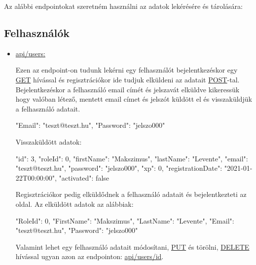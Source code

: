 
Az alábbi endpointokat szeretném használni az adatok lekérésére és tárolására:
\subsection{Felhasználók}
\begin{itemize}[label={$\bullet$}, topsep=0pt, itemsep=0pt, leftmargin=15pt]
    \item[] {\url{api/users:}}
          \begin{addmargin}[\parindent]{0pt}
              Ezen az endpoint-on tudunk lekérni egy felhasználót bejelentkezéskor egy \url{GET} hívással és regisztrációkor ide tudjuk elküldeni az adatait \url{POST}-tal. Bejelentkezéskor a felhasználó email címét és jelszavát elküldve kikeressük hogy valóban létező, mentett email címet és jelszót küldött el és visszaküldjük a felhasználó adatait.

              \begin{json}
{
    "Email": "teszt@teszt.hu",
    "Password": "jelszo000"
}
              \end{json}

              Visszaküldött adatok:
              \begin{json}
{
    "id": 3,
    "roleId": 0,
    "firstName": "Makszimus",
    "lastName": "Levente",
    "email": "teszt@teszt.hu",
    "password": "jelszo000",
    "xp": 0,
    "registrationDate": "2021-01-22T00:00:00",
    "activated": false
}
            \end{json}

              Regisztrációkor pedig elküldődnek a felhasználó adatait és bejelentkezteti az oldal. Az elküldött adatok az alábbiak:

              \begin{json}
{
    "RoleId": 0,
    "FirstName": "Makszimus",
    "LastName": "Levente",
    "Email": "teszt@teszt.hu",
    "Password": "jelszo000"
}
            \end{json}

              Valamint lehet egy felhasználó adatait módosítani, \url{PUT} és törölni, \url{DELETE} hívással ugyan azon az endpointon: \url{api/users/id}.
          \end{addmargin}
\end{itemize}

